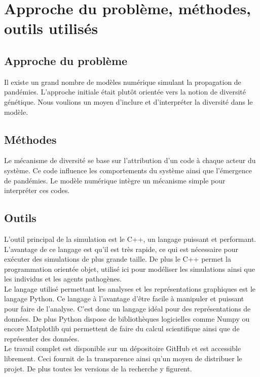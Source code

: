 \chapter{Approche du problème, méthodes, outils utilisés} \label{ch:approche}

\section{Approche du problème}
Il existe un grand nombre de modèles numérique simulant la propagation de pandémies. L'approche initiale était plutôt orientée vers la notion de diversité génétique. Nous voulions un moyen d'inclure et d'interpréter la diversité dans le modèle.

\section{Méthodes}
Le mécanisme de diversité se base sur l'attribution d'un code à chaque acteur du système. Ce code influence les comportements du système ainsi que l'émergence de pandémies. Le modèle numérique intègre un mécanisme simple pour interpréter ces codes.

\section{Outils}
L'outil principal de la simulation est le C++, un langage puissant et performant. L'avantage de ce langage est qu'il est très rapide, ce qui est nécessaire pour exécuter des simulations de plus grande taille. De plus le C++ permet la programmation orientée objet, utilisé ici pour modéliser les simulations ainsi que les individus et les agents pathogènes.\\

Le langage utilisé permettant les analyses et les représentations graphiques est le langage Python. Ce langage à l'avantage d'être facile à manipuler et puissant pour faire de l'analyse. C'est donc un langage idéal pour des représentations de données. De plus Python dispose de bibliothèques logicielles comme Numpy ou encore Matplotlib qui permettent de faire du calcul scientifique ainsi que de représenter des données.\\

Le travail complet est disponible sur un dépositoire GitHub et est accessible librement. Ceci fournit de la transparence ainsi qu'un moyen de distribuer le projet. De plus toutes les versions de la recherche y figurent.
